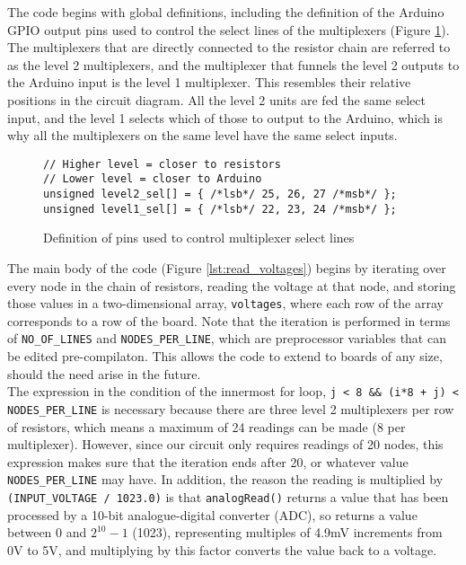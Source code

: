 
The code begins with global definitions, including the definition of the Arduino GPIO output pins used to  control the select lines of the multiplexers (Figure \ref{lst:mux_sel}). The multiplexers that are directly connected to the resistor chain are referred to as the level 2 multiplexers, and the multiplexer that funnels the level 2 outputs to the Arduino input is the level 1 multiplexer. This resembles their relative positions in the circuit diagram. All the level 2 units are fed the same select input, and the level 1 selects which of those to output to the Arduino, which is why all the multiplexers on the same level have the same select inputs.

\begin{figure}[H]
\centering
\begin{verbatim}
// Higher level = closer to resistors
// Lower level = closer to Arduino
unsigned level2_sel[] = { /*lsb*/ 25, 26, 27 /*msb*/ }; 
unsigned level1_sel[] = { /*lsb*/ 22, 23, 24 /*msb*/ };
\end{verbatim}
\caption{Definition of pins used to control multiplexer select lines }
\label{lst:mux_sel}
\end{figure}

The main body of the code (Figure \ref{lst:read_voltages}) begins by iterating over every node in the chain of resistors, reading the voltage at that node, and storing those values in a two-dimensional array, \texttt{voltages}, where each row of the array corresponds to a row of the board. Note that the iteration is performed in terms of \texttt{NO\_OF\_LINES} and \texttt{NODES\_PER\_LINE}, which are preprocessor variables that can be edited pre-compilaton. This allows the code to extend to boards of any size, should the need arise in the future. \\

The expression in the condition of the innermost for loop, \texttt{j < 8 \&\& (i*8 + j) < NODES\_PER\_LINE} is necessary because there are three level 2 multiplexers per row of resistors, which means a maximum of 24 readings can be made (8 per multiplexer). However, since our circuit only requires readings of 20 nodes, this expression makes sure that the iteration ends after 20, or whatever value \texttt{NODES\_PER\_LINE} may have. In addition, the reason the reading is multiplied by \texttt{(INPUT\_VOLTAGE / 1023.0)} is that \texttt{analogRead()} returns a value that has been processed by a 10-bit analogue-digital converter (ADC), so returns a value between 0 and $2^{10}-1$ (1023), representing multiples of 4.9mV increments from 0V to 5V, and multiplying by this factor converts the value back to a voltage.


